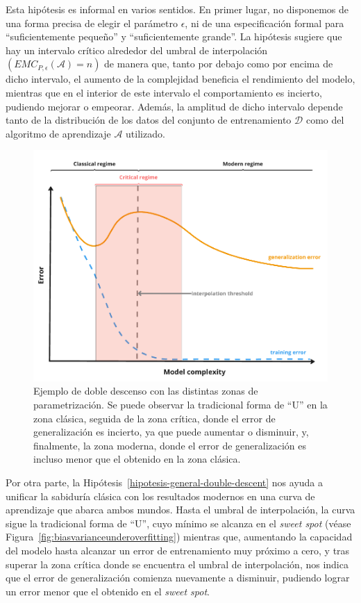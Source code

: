 Esta hipótesis es informal en varios sentidos. En primer lugar, no disponemos de una forma precisa de elegir el parámetro $\epsilon$, ni de una especificación formal para ``suficientemente pequeño'' y ``suficientemente grande''. La hipótesis sugiere que hay un intervalo crítico alrededor del umbral de interpolación $(EMC_{P, \epsilon}(\mathcal{A}) = n)$ de manera que, tanto por debajo como por encima de dicho intervalo, el aumento de la complejidad beneficia el rendimiento del modelo, mientras que en el interior de este intervalo el comportamiento es incierto, pudiendo mejorar o empeorar. Además, la amplitud de dicho intervalo depende tanto de la distribución de los datos del conjunto de entrenamiento $\mathcal{D}$ como del algoritmo de aprendizaje $\mathcal{A}$ utilizado.\newline

\begin{figure}[h]
    \centering
    \includegraphics[width=0.65\linewidth]{img/planteamiento-teorico-dd.png}
    \caption[Ejemplo de doble descenso con las distintas zonas de parametrización.]{Ejemplo de doble descenso con las distintas zonas de parametrización. Se puede observar la tradicional forma de ``U'' en la zona clásica, seguida de la zona crítica, donde el error de generalización es incierto, ya que puede aumentar o disminuir, y, finalmente, la zona moderna, donde el error de generalización es incluso menor que el obtenido en la zona clásica.}\label{fig:planteamiento-teorico-dd.png}
\end{figure}

Por otra parte, la Hipótesis~\ref{hipotesis-general-double-descent} nos ayuda a unificar la sabiduría clásica con los resultados modernos en una curva de aprendizaje que abarca ambos mundos. Hasta el umbral de interpolación, la curva sigue la tradicional forma de ``U'', cuyo mínimo se alcanza en el \textit{sweet spot} (véase Figura~\ref{fig:biasvarianceunderoverfitting}) mientras que, aumentando la capacidad del modelo hasta alcanzar un error de entrenamiento muy próximo a cero, y tras superar la zona crítica donde se encuentra el umbral de interpolación, nos indica que el error de generalización comienza nuevamente a disminuir, pudiendo lograr un error menor que el obtenido en el \textit{sweet spot}.\newline

